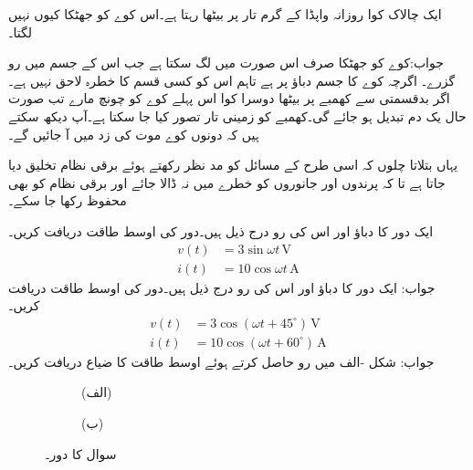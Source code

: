 ایک چالاک کوا روزانہ واپڈا کے   گرم تار پر بیٹھا رہتا ہے۔اس کوے کو جھٹکا کیوں نہیں لگتا۔

جواب:کوے کو جھٹکا صرف اس صورت میں لگ سکتا ہے جب اس کے جسم میں رو گزرے۔ اگرچہ کوے کا جسم  دباؤ پر ہے تاہم اس کو کسی قسم کا خطرہ لاحق نہیں ہے۔اگر بدقسمتی سے کھمبے پر بیٹھا دوسرا کوا اس پہلے کوے کو چونچ مارے تب صورت حال یک دم تبدیل ہو جائے گی۔کھمبے کو زمینی تار تصور کیا جا سکتا ہے۔آپ دیکھ سکتے ہیں کہ دونوں کوے موت کی زد میں آ جائیں گے۔

یہاں بتلاتا چلوں کہ اسی طرح کے مسائل کو مد نظر رکھتے ہوئے برقی نظام  تخلیق دیا جاتا ہے تا کہ پرندوں اور جانوروں کو خطرے  میں نہ ڈالا جائے اور برقی نظام کو بھی محفوظ رکھا جا سکے۔

ایک دور کا دباؤ اور اس کی رو درج ذیل ہیں۔دور کی اوسط طاقت دریافت کریں۔
\begin{align*}
v(t)&=3\sin \omega t \, \si{\volt}\\
i(t)&=10\cos \omega t \,\si{\ampere}
\end{align*}
جواب:
ایک دور کا دباؤ اور اس کی رو درج ذیل ہیں۔دور کی اوسط طاقت دریافت کریں۔
\begin{align*}
v(t)&=3\cos (\omega t+45^{\circ}) \, \si{\volt}\\
i(t)&=10\cos (\omega t+60^{\circ}) \,\si{\ampere}
\end{align*}
جواب:
شکل -الف میں رو حاصل کرتے ہوئے اوسط طاقت کا ضیاع دریافت کریں۔
\begin{figure}
\centering
\begin{subfigure}{0.4\textwidth}
\centering
{}
\caption*{(الف)}
\end{subfigure}%
\begin{subfigure}{0.6\textwidth}
\centering
{}
\caption*{(ب)}
\end{subfigure}%
\caption{سوال  کا دور۔}
\label{شکل_سوال_طاقت_الف}
\end{figure}


